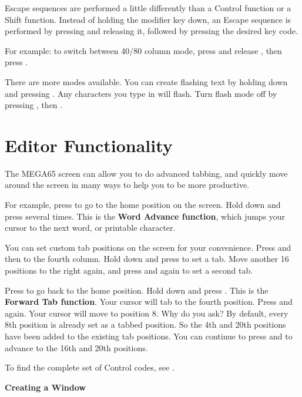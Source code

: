 Escape sequences are performed a little differently than a Control function or a Shift function. Instead of holding the modifier key down, an Escape sequence is performed by pressing  and releasing it, followed by pressing the desired key code.

For example: to switch between 40/80 column mode, press and release , then press .

There are more modes available. You can create flashing text by holding  down and pressing . Any characters you type in will flash. Turn flash mode off by pressing ,  then .



\section{Editor Functionality}


The MEGA65 screen can allow you to do advanced tabbing, and quickly move around the screen in many ways to help you to be more productive.

For example, press  to go to the home position on the screen. Hold  down and press  several times. This is the \textbf{Word Advance function}, which jumps your cursor to the next word, or printable character.

You can set custom tab positions on the screen for your convenience. Press  and then \megakey{$\rightarrow$} to the fourth column. Hold down  and press  to set a tab. Move another 16 positions to the right again, and press  and  again to set a second tab.

Press  to go back to the home position. Hold  down and press . This is the \textbf{Forward Tab function}. Your cursor will tab to the fourth position. Press  and  again. Your cursor will move to position 8. Why do you ask? By default, every 8th position is already set as a tabbed position. So the 4th and 20th positions have been added to the existing tab positions. You can continue to press  and  to advance to the 16th and 20th positions.

To find the complete set of Control codes, see .

\textbf{Creating a Window}

